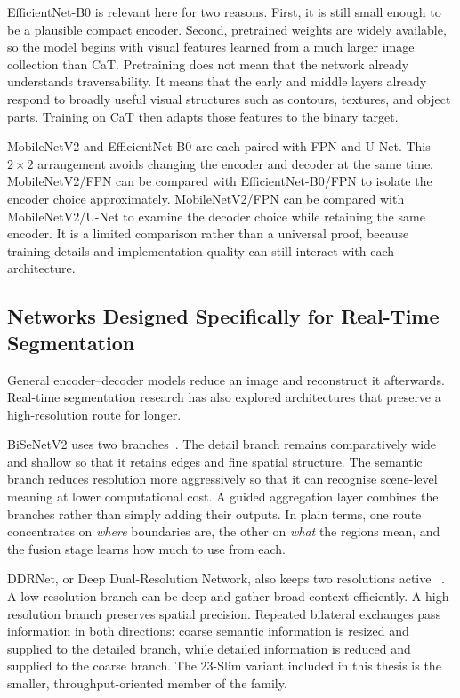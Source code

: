 EfficientNet-B0 is relevant here for two reasons. First, it is still small
enough to be a plausible compact encoder. Second, pretrained weights are
widely available, so the model begins with visual features learned from a much
larger image collection than CaT. Pretraining does not mean that the network
already understands traversability. It means that the early and middle layers
already respond to broadly useful visual structures such as contours,
textures, and object parts. Training on CaT then adapts those features to the
binary target.

MobileNetV2 and EfficientNet-B0 are each paired with FPN and U-Net. This
$2\times2$ arrangement avoids changing the encoder and decoder at the same
time. MobileNetV2/FPN can be compared with EfficientNet-B0/FPN to isolate the
encoder choice approximately. MobileNetV2/FPN can be compared with
MobileNetV2/U-Net to examine the decoder choice while retaining the same
encoder. It is a limited comparison rather than a universal proof, because
training details and implementation quality can still interact with each
architecture.

\subsection{Networks Designed Specifically for Real-Time Segmentation}

General encoder--decoder models reduce an image and reconstruct it afterwards.
Real-time segmentation research has also explored architectures that preserve
a high-resolution route for longer.

BiSeNetV2 uses two branches~\cite{yu2021bisenetv2}. The detail branch remains
comparatively wide and shallow so that it retains edges and fine spatial
structure. The semantic branch reduces resolution more aggressively so that
it can recognise scene-level meaning at lower computational cost. A guided
aggregation layer combines the branches rather than simply adding their
outputs. In plain terms, one route concentrates on \emph{where} boundaries
are, the other on \emph{what} the regions mean, and the fusion stage learns
how much to use from each.

DDRNet, or Deep Dual-Resolution Network, also keeps two resolutions active
~\cite{hong2022ddrnet}. A low-resolution branch can be deep and gather broad
context efficiently. A high-resolution branch preserves spatial precision.
Repeated bilateral exchanges pass information in both directions: coarse
semantic information is resized and supplied to the detailed branch, while
detailed information is reduced and supplied to the coarse branch. The
23-Slim variant included in this thesis is the smaller, throughput-oriented
member of the family.

